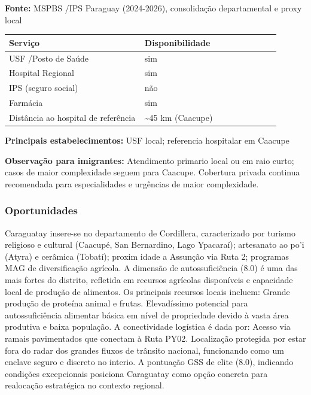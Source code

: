 \textbf{Fonte:} MSPBS /\allowbreak  IPS Paraguay (2024-2026), consolidação
departamental e proxy local

{\def\LTcaptype{none} %
\begin{longtable}{@{}>{\raggedright\arraybackslash}p{0.45\linewidth} >{\raggedright\arraybackslash}p{0.45\linewidth}@{}}
\toprule\noalign{}
Serviço & Disponibilidade \\
\midrule\noalign{}
\endhead
\bottomrule\noalign{}
\endlastfoot
USF /\allowbreak  Posto de Saúde & sim \\
Hospital Regional & sim \\
IPS (seguro social) & não \\
Farmácia & sim \\
Distância ao hospital de referência & \textasciitilde45 km (Caacupe) \\
\end{longtable}
}

\textbf{Principais estabelecimentos:} USF local; referencia hospitalar
em Caacupe

\textbf{Observação para imigrantes:} Atendimento primario local ou em
raio curto; casos de maior complexidade seguem para Caacupe. Cobertura
privada continua recomendada para especialidades e urgências de maior
complexidade.
\newpage

\subsubsection*{Oportunidades}\label{oport-caraguatay-0305}
Caraguatay insere-se no departamento de Cordillera, caracterizado por turismo religioso e cultural (Caacupé, San Bernardino, Lago Ypacaraí); artesanato ao po'i (Atyra) e cerâmica (Tobatí); proxim idade a Assunção via Ruta 2; programas MAG de diversificação agrícola. A dimensão de autossuficiência (8.0) é uma das mais fortes do distrito, refletida em recursos agrícolas disponíveis e capacidade local de produção de alimentos. Os principais recursos locais incluem: Grande produção de proteína animal e frutas. Elevadíssimo potencial para autossuficiência alimentar básica em nível de propriedade devido à vasta área produtiva e baixa população. A conectividade logística é dada por: Acesso via ramais pavimentados que conectam à Ruta PY02. Localização protegida por estar fora do radar dos grandes fluxos de trânsito nacional, funcionando como um enclave seguro e discreto no interio. A pontuação GSS de elite (8.0), indicando condições excepcionais posiciona Caraguatay como opção concreta para realocação estratégica no contexto regional.

